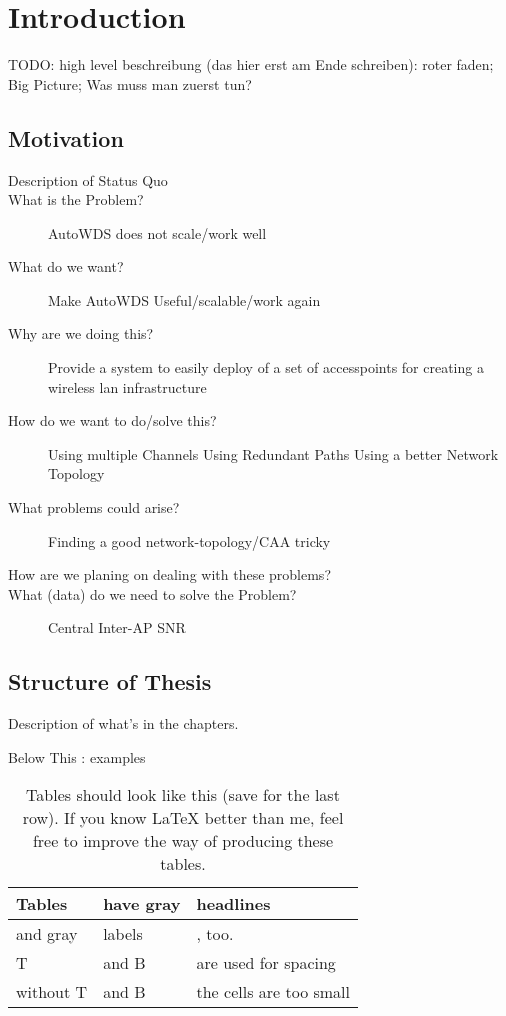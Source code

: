 \chapter{Introduction}
TODO: high level beschreibung (das hier erst am Ende schreiben): roter faden; Big Picture; Was muss man zuerst tun?
\section{Motivation}
\begin{description}
\item[Description of Status Quo]
\item[What is the Problem?]
AutoWDS does not scale/work well
\item[What do we want?]
Make AutoWDS Useful/scalable/work again
\item[Why are we doing this?]
Provide a system to easily deploy of a set of accesspoints for creating a wireless lan infrastructure
\item[How do we want to do/solve this?]
Using multiple Channels
Using Redundant Paths Using a better Network Topology
\item[What problems could arise?]
Finding a good network-topology/CAA tricky
\item[How are we planing on dealing with these problems?]
\item[What (data) do we need to solve the Problem?]
Central Inter-AP SNR
\end{description}

\section{Structure of Thesis}
Description of what's in the chapters.

Below This : examples

\begin{table}[b]
\caption{Tables should look like this (save for the last row). If you know LaTeX better than me, feel free to improve the way of producing these tables.}
\begin{tabularx}{\linewidth}{|l|X|X|}
\hline
\rowcolor{slightgray}
\T Tables	&have gray  &headlines\\
\hline
\cellcolor{slightgray}\T and gray &labels \B&, too.\\
\hline
\cellcolor{slightgray}\T T &and B& are used for spacing\B\\
\hline
\cellcolor{slightgray} without T & and B& the cells are too small\B\\
\hline 
\end{tabularx}
\label{tab:example}
\end{table}

